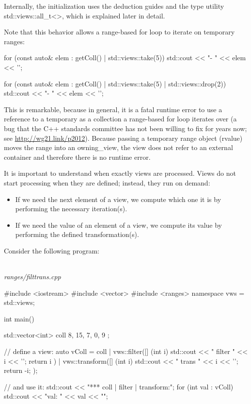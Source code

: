 Internally, the initialization uses the deduction guides and the type utility std::views::all\_t<>, which is explained later in detail.

Note that this behavior allows a range-based for loop to iterate on temporary ranges:

\begin{cpp}
for (const auto& elem : getColl() | std::views::take(5)) {
	std::cout << "- " << elem << '\n';
}

for (const auto& elem : getColl() | std::views::take(5) | std::views::drop(2)) {
	std::cout << "- " << elem << '\n';
}
\end{cpp}

This is remarkable, because in general, it is a fatal runtime error to use a reference to a temporary as a collection a range-based for loop iterates over (a bug that the C++ standards committee has not been willing to fix for years now; see \url{http://wg21.link/p2012}). Because passing a temporary range object (rvalue) moves the range into an owning\_view, the view does not refer to an external container and therefore there is no runtime error.


It is important to understand when exactly views are processed. Views do not start processing when they are defined; instead, they run on demand:

\begin{itemize}
\item
If we need the next element of a view, we compute which one it is by performing the necessary iteration(s).

\item
If we need the value of an element of a view, we compute its value by performing the defined transformation(s).
\end{itemize}

Consider the following program:

\noindent
\hspace*{\fill} \\ %
\textit{ranges/filttrans.cpp}

\begin{cpp}
#include <iostream>
#include <vector>
#include <ranges>
namespace vws = std::views;

int main()
{
	std::vector<int> coll{ 8, 15, 7, 0, 9 };
	
	// define a view:
	auto vColl = coll
				| vws::filter([] (int i) {
					std::cout << " filter " << i << '\n';
					return i %
				})
				| vws::transform([] (int i) {
					std::cout << " trans " << i << '\n';
					return -i;
				});
				
	// and use it:
	std::cout << "*** coll | filter | transform:\n";
	for (int val : vColl) {
		std::cout << "val: " << val << "\n\n";
	}
}
\end{cpp}

